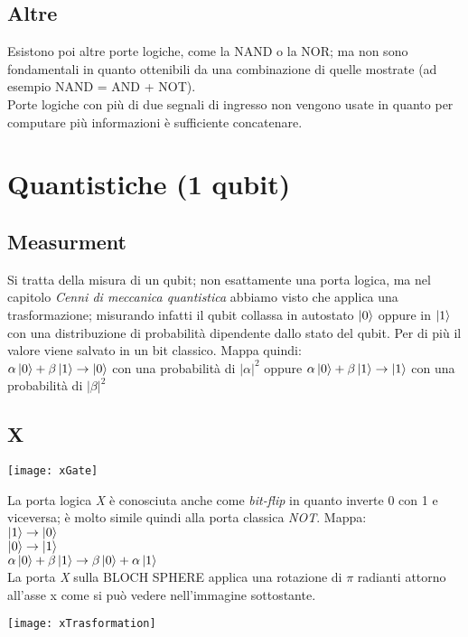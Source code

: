 \subsection{Altre}
Esistono poi altre porte logiche, come la NAND o la NOR; ma non sono fondamentali in quanto ottenibili da una combinazione di quelle mostrate (ad esempio NAND = AND + NOT).\\
Porte logiche con più di due segnali di ingresso non vengono usate in quanto per computare più informazioni è sufficiente concatenare.
\section{Quantistiche (1 qubit)}
\subsection{Measurment}
Si tratta della misura di un qubit; non esattamente una porta logica, ma nel capitolo \textit{Cenni di meccanica quantistica} abbiamo visto che applica una trasformazione; misurando infatti il qubit collassa in autostato $\ket{0}$ oppure in $\ket{1}$ con una distribuzione di probabilità dipendente dallo stato del qubit. Per di più il valore viene salvato in un bit classico. Mappa quindi:\\
$\alpha\ket{0} + \beta\ket{1} \rightarrow \ket{0}$ con una probabilità di $|\alpha|^2$ oppure $\alpha\ket{0} + \beta\ket{1} \rightarrow \ket{1}$ con una probabilità di $|\beta|^2$
\subsection{X}
\begin{center}
\texttt{[image: xGate]}
\end{center}
La porta logica \textit{X} è conosciuta anche come \textit{bit-flip} in quanto inverte 0 con 1 e viceversa; è molto simile quindi alla porta classica \textit{NOT}. Mappa:\\
$\ket{1} \rightarrow \ket{0}$\\
$\ket{0} \rightarrow \ket{1}$\\
$\alpha\ket{0} + \beta\ket{1} \rightarrow \beta\ket{0} + \alpha\ket{1}$\\
La porta \textit{X} sulla BLOCH SPHERE applica una rotazione di $\pi$ radianti attorno all'asse x come si può vedere nell'immagine sottostante.
\begin{center}
\texttt{[image: xTrasformation]}
\end{center}

